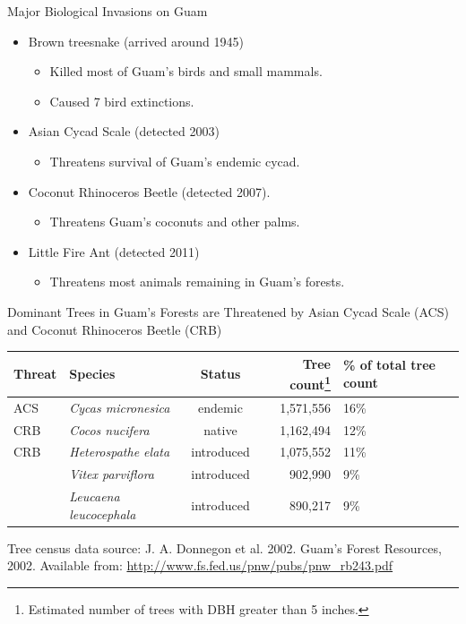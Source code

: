 \documentclass[]{beamer}
\begin{document}
\begin{frame}{Major Biological Invasions on Guam}
	\begin{itemize}
		\item Brown treesnake (arrived around 1945)
		\begin{itemize}
			\item Killed most of Guam's birds and small mammals. 
			\item Caused 7 bird extinctions.
		\end{itemize}
		\item Asian Cycad Scale (detected 2003)
		\begin{itemize}
			\item Threatens survival of Guam's endemic cycad.
		\end{itemize}
		\item Coconut Rhinoceros Beetle (detected 2007). 
		\begin{itemize}
			\item Threatens Guam's coconuts and other palms.
		\end{itemize}
		\item Little Fire Ant (detected 2011)
		\begin{itemize}
			\item Threatens most animals remaining in Guam's forests.
		\end{itemize}
	\end{itemize}		
\end{frame}

\begin{frame}{Dominant Trees in Guam's Forests are Threatened by Asian Cycad Scale (ACS) and Coconut Rhinoceros Beetle (CRB)}
	\begin{center}
		\begin{tabular}{llcrp{0.35in}}
			\hline
			\textbf{Threat} & \textbf{Species} & \textbf{Status} & \textbf{Tree count\footnote{Estimated number of trees with DBH greater than 5 inches.}} & \textbf{\% of total tree count}\\
			\hline
			ACS & \textit{Cycas micronesica} & endemic & 1,571,556 & 16\% \\ 
			CRB & \textit{Cocos nucifera} & native & 1,162,494 & 12\% \\ 
			CRB & \textit{Heterospathe elata} & introduced & 1,075,552 & 11\% \\ 
			& \textit{Vitex parviflora} & introduced & 902,990 & 9\% \\ 
			& \textit{Leucaena leucocephala} & introduced & 890,217 & 9\%\\
			\hline
		\end{tabular} 
	\end{center}
	Tree census data source: J. A. Donnegon et al. 2002. Guam’s Forest Resources, 2002. Available from: \url{http://www.fs.fed.us/pnw/pubs/pnw_rb243.pdf}
	
\end{frame}
\end{document}

